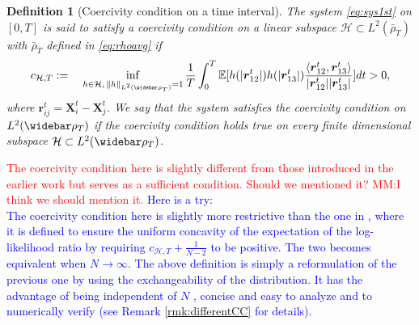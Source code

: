 \documentclass[]{elsarticle}
\def\E{\mathbb{E}}
\newcommand{\wbar}\widebar
\newcommand{\mbf}[1]{\boldsymbol{#1}}
\newcommand{\innerp}[2]{\langle #1,#2 \rangle}
\newcommand{\br}{\mbf{r}}
\newcommand{\bX}{\mbf{X}}
\newcommand{\hypspace}{\mathcal{H}}
\newcommand{\FL}[1]{\textcolor{blue}{{#1}}}
\newtheorem{definition}[theorem]{Definition}
\numberwithin{equation}{section}
\numberwithin{theorem}{section}
\begin{document}
\begin{definition}[Coercivity condition on a time interval] \label{def_coercivty}
The  system \eqref{eq:sys1st} on $[0,T]$ %
 is said to satisfy a coercivity condition on a linear subspace $\mathcal{H}\subset L^2(\bar \rho_T)$ with $\bar \rho_T$ defined in \eqref{eq:rhoavg} if
\begin{equation} \label{eq:coercivityDef}
c_{\mathcal{H},T} : = \quad \inf_{h\in  \mathcal{H}, \, \|h\|_{L^2(\wbar \rho_T)}=1}\frac{1}{T}\int_{0}^T \E[h(|\br_{12}^t|)h(|\br_{13}^t|)\frac{\innerp{\br_{12}^t}{\br_{13}^t}}{|\br_{12}^t||\br_{13}^t|} ]dt >0,
\end{equation}
where $\br_{ij}^t = \bX^{t}_i- \bX^t_j$. We say that the system satisfies the coercivity condition on $L^2(\wbar \rho_T)$ if the coercivity condition holds true on every finite dimensional subspace $\mathcal{H} \subset L^2(\wbar \rho_T)$. 
\end{definition}

\textcolor{red}{The coercivity condition here is slightly different from those introduced in the earlier work but serves as a sufficient condition. Should we mentioned it?} \textcolor{red}{MM:I think we should mention it.}
\FL{Here is a try: \\
The coercivity condition here is slightly more restrictive than the one in \cite{LZTM19,LMT19,LMT20}, where it is defined to ensure the uniform concavity of the expectation of the log-likelihood ratio by requiring  $c_{\hypspace,T}+\frac{1}{N-2}$ to be positive. The two becomes equivalent when $N\to \infty$. The above definition is simply a reformulation of the previous one by using the exchangeability of the distribution. It has the advantage of being independent of $N$ , concise and easy to analyze and to numerically verify (see Remark \ref{rmk:differentCC} for details).  
}
\end{document}
